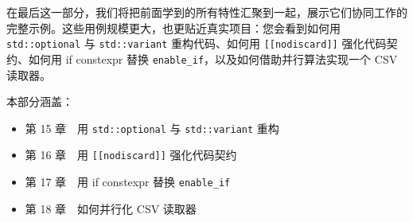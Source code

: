 在最后这一部分，我们将把前面学到的所有特性汇聚到一起，展示它们协同工作的完整示例。这些用例规模更大，也更贴近真实项目：您会看到如何用 \texttt{std::optional} 与 \texttt{std::variant} 重构代码、如何用 \texttt{\texttt{\texttt{[[nodiscard]]}}} 强化代码契约、如何用 if constexpr 替换 \texttt{enable\_if}，以及如何借助并行算法实现一个 CSV 读取器。

本部分涵盖：

\begin{itemize}
  \item 第 15 章　用 \texttt{std::optional} 与 \texttt{std::variant} 重构
  \item 第 16 章　用 \texttt{\texttt{\texttt{[[nodiscard]]}}} 强化代码契约
  \item 第 17 章　用 if constexpr 替换 \texttt{enable\_if}
  \item 第 18 章　如何并行化 CSV 读取器
\end{itemize}
